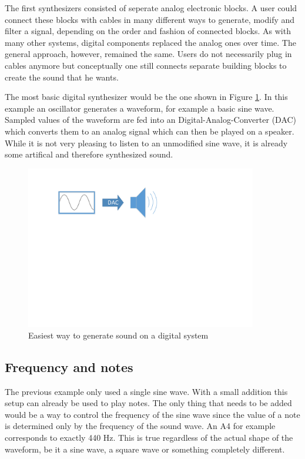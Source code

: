		The first synthesizers consisted of seperate analog electronic blocks.
		A user could connect these blocks with cables in many different ways to generate, modify and filter a signal, depending on the order and fashion of connected blocks.
		As with many other systems, digital components replaced the analog ones over time.
		The general approach, however, remained the same. 
		Users do not necessarily plug in cables anymore but conceptually one still connects separate building blocks to create the sound that he wants.
		
		The most basic digital synthesizer would be the one shown in Figure \ref{fig:sound_generation}. 
		In this example an oscillator generates a waveform, for example a basic sine wave.
		Sampled values of the waveform are fed into an Digital-Analog-Converter (DAC) which converts them to an analog signal which can then be played on a speaker.
		While it is not very pleasing to listen to an unmodified sine wave, it is already some artifical and therefore synthesized sound.
		
	  	\begin{figure}[!h]
		\centering
			\includegraphics[width=0.90\textwidth]{images/sound_generation.pdf}
		\caption{Easiest way to generate sound on a digital system}
		\label{fig:sound_generation}
		\end{figure}
		
		\subsection{Frequency and notes}
		The previous example only used a single sine wave. 
		With a small addition this setup can already be used to play notes.
		The only thing that needs to be added would be a way to control the frequency of the sine wave since the value of a note is determined only by the frequency of the sound wave. 
		An A4 for example corresponds to exactly 440 Hz.
		This is true regardless of the actual shape of the waveform, be it a sine wave, a square wave or something completely different. 

